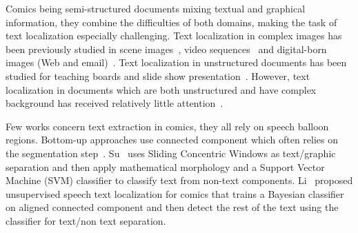 Comics being semi-structured documents mixing textual and graphical information, they combine the difficulties of both domains, making the task of text localization especially challenging.
Text localization in complex images has been previously studied in scene images~\cite{Weinman09,Epshtein10,Neumann12,Wang10,Meng12}, video sequences~\cite{Wonjun09,Shivakumara09} and digital-born images (Web and email)~\cite{Karatzas07}. 
Text localization in unstructured documents has been studied for teaching boards and slide show presentation~\cite{Oliveira10,Vajda2012Method,Nguyen2013BagOfSubjects}.
However, text localization in documents which are both unstructured and have complex background has received relatively little attention~\cite{Clavelli09}.

Few works concern text extraction in comics, they all rely on speech balloon regions.
Bottom-up approaches use connected component which often relies on the segmentation step~\cite{ponsard2012ocr}.
Su~\cite{Su11} uses Sliding Concentric Windows as text/graphic separation and then apply mathematical morphology and a Support Vector Machine (SVM) classifier to classify text from non-text components. 
Li~\cite{Li2013Unsupervised} proposed unsupervised speech text localization for comics that trains a Bayesian classifier on aligned connected component and then detect the rest of the text using the classifier for text/non text separation.
 

